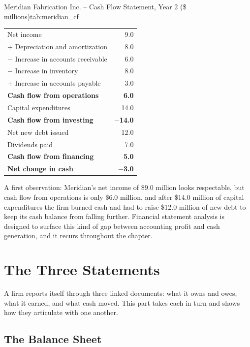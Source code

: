 \documentclass[../ai_in_finance]{subfiles}
\begin{document}
\begin{booktable}[htbp]{Meridian Fabrication Inc. -- Cash Flow Statement, Year 2 (\$ millions)}{tab:meridian_cf}
\begin{tabular}{lr}
\toprule
Net income                                & 9.0 \\
$+$ Depreciation and amortization         & 8.0 \\
$-$ Increase in accounts receivable       & 6.0 \\
$-$ Increase in inventory                 & 8.0 \\
$+$ Increase in accounts payable          & 3.0 \\
\textbf{Cash flow from operations}        & \textbf{6.0} \\
Capital expenditures                      & 14.0 \\
\textbf{Cash flow from investing}         & \textbf{$-$14.0} \\
Net new debt issued                       & 12.0 \\
Dividends paid                            & 7.0 \\
\textbf{Cash flow from financing}         & \textbf{5.0} \\
\textbf{Net change in cash}               & \textbf{$-$3.0} \\
\bottomrule
\end{tabular}
\end{booktable}

A first observation: Meridian's net income of \$9.0 million looks respectable, but cash flow from operations is only \$6.0 million, and after \$14.0 million of capital expenditures the firm burned cash and had to raise \$12.0 million of new debt to keep its cash balance from falling further. Financial statement analysis is designed to surface this kind of gap between accounting profit and cash generation, and it recurs throughout the chapter.

\section{The Three Statements}

A firm reports itself through three linked documents: what it owns and owes, what it earned, and what cash moved. This part takes each in turn and shows how they articulate with one another.

\subsection{The Balance Sheet}
\end{document}
